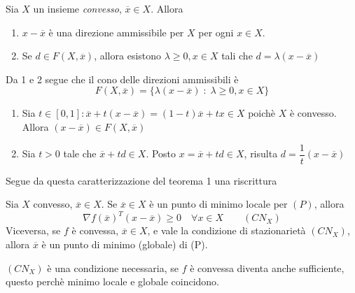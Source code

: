 \begin{proposition}
  \label{prop:cono-convesso}
  Sia $X$ un insieme \emph{convesso}, $\overline{x} \in X$. Allora
  \begin{enumerate}
  \item $x -\overline{x}$ \`e una direzione ammissibile per $X$ per
    ogni $x \in X$.
  \item Se $d \in F(X, \overline{x})$, allora esistono $\lambda \geq 0,
    x \in X$ tali che $d = \lambda(x - \overline{x}) $
  \end{enumerate}
  Da 1 e 2 segue che il cono delle direzioni ammissibili è
  $$ F(X, \overline{x}) = \{ \lambda(x -\overline{x}) \; : \;
  \lambda \geq 0, x \in X \} $$ 
\end{proposition}

\begin{thproof}
  \begin{enumerate}
  \item Sia $ t\in [0,1]: \overline{x} + t(x -\overline{x}) = 
  (1-t) \overline{x} + tx \in X $ poich\`e $X$ \`e convesso.
  Allora $(x - \overline{x}) \in F(X, \overline{x})$ 
 \item Sia $t > 0$ tale che $\overline{x} + td \in X$.
 Posto  $x = \overline{x} + td \in X$, risulta 
$ d = \dfrac{1}{t}(x - \overline{x})$
  \end{enumerate}
\end{thproof}
Segue da questa caratterizzazione del teorema 1 una riscrittura

\begin{theo}
  Sia $X$ convesso, $\overline{x} \in X$.
  Se $\overline{x} \in X$ \`e un punto di minimo locale
  per $(P)$, allora
  $$ \nabla f(\overline{x})^{T}(x - \overline{x}) \geq 0
  \quad \forall x \in X \qquad (CN_{X})$$
  Viceversa, se $f$ \`e convessa, $\overline{x} \in X$, e vale la
  condizione di stazionariet\`a $(CN_{X})$, allora $\overline{x}$ \`e un
  punto di minimo (globale) di (P).
\end{theo}
$(CN_{X})$ è una condizione necessaria, se $f$ è convessa diventa
anche sufficiente, questo perch\`e minimo locale e globale coincidono.

